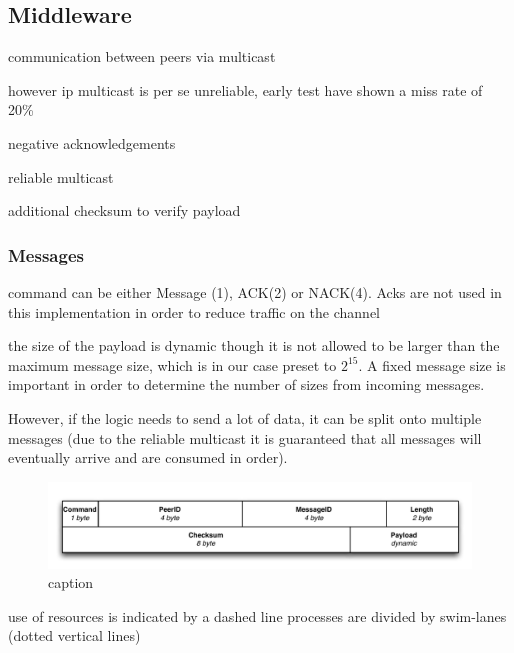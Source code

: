 


\subsection{Middleware}
communication between peers via multicast 

however ip multicast is per se unreliable, early test have shown a miss rate of 20\%

negative acknowledgements

reliable multicast

additional checksum to verify payload

\subsubsection{Messages}


command can be either Message (1), ACK(2) or NACK(4). 
Acks are not used in this implementation in order to reduce traffic on the channel 

the size of the payload is dynamic though it is not allowed to be larger than the maximum message size, which is in our case preset to $2^15$. A fixed message size is important in order to determine the number of sizes from incoming messages. 


However, if the logic needs to send a lot of data, it can be split onto multiple messages (due to the reliable multicast it is guaranteed that all messages will eventually arrive and are consumed in order).



\begin{figure}[htbp]
    \centering
        \includegraphics[width=.9\textwidth]{figures/message.pdf}
    \caption{caption}
    \label{fig:figures_announcement}
\end{figure}

use of resources  is indicated by a dashed line 
processes are divided by swim-lanes (dotted vertical lines)

